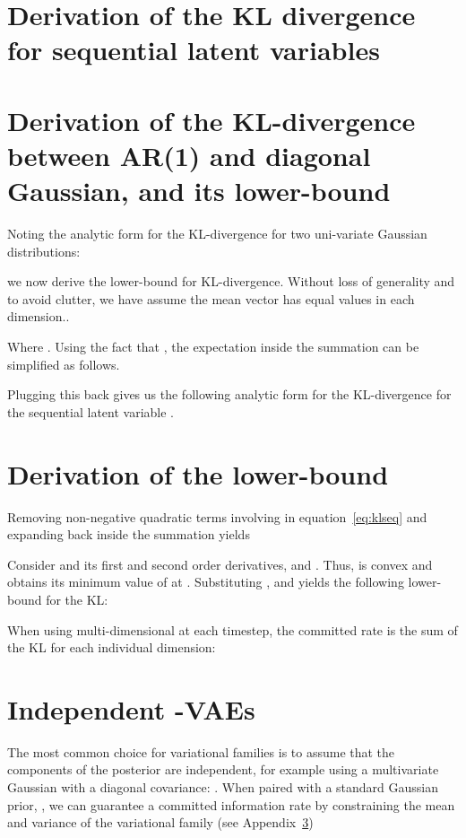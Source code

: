 \documentclass{article} \usepackage{iclr2019_conference,times}
\def\eqref#1{equation~\ref{#1}}
\newcommand{\aref}[1]{Appendix~\ref{#1}}
\begin{document}



\appendix

\section{Derivation of the KL divergence for sequential latent variables}\label{app:seqkl}




\section{Derivation of the KL-divergence between AR(1) and diagonal Gaussian, and its lower-bound}


Noting the analytic form for the KL-divergence for two uni-variate Gaussian distributions:


we now derive the lower-bound for KL-divergence.  Without loss of generality and to avoid clutter, we have assume the mean vector  has equal values in each dimension.\cite{Newell81}.




Where . Using the fact that , the  expectation inside the summation can be simplified as follows.


Plugging this back gives us the following analytic form for the KL-divergence for the sequential latent variable .



\section{Derivation of the lower-bound}\label{app:deriv}

Removing non-negative quadratic terms involving  in \eqref{eq:klseq} and expanding back  inside the summation yields



Consider  and its first and second order derivatives,   and . Thus,  is convex  and obtains its minimum value of  at . Substituting ,  and  yields the following lower-bound for the KL:



When using multi-dimensional  at each timestep, the committed rate is the sum of the KL for each individual dimension:







\section{Independent -VAEs}
\label{app:indep}
 The most common choice for variational families is to assume that the components of the posterior are independent, for example using a multivariate Gaussian with a diagonal covariance: . When paired with a standard Gaussian prior, , we can guarantee a committed information rate   by constraining the mean and variance of the variational family (see \aref{app:deriv})
 
\end{document}
